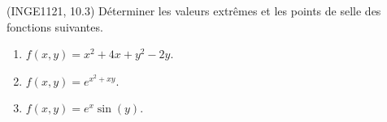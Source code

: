 
\begin{exercice}\label{exoFoncDeuxVar0028}

	(INGE1121, 10.3) Déterminer les valeurs extrêmes et les points de selle des fonctions suivantes.
	\begin{multicols}{2}
		\begin{enumerate}
			\item	%
				$f(x,y)=x^2+4x+y^2-2y$.
			\item	%
				$f(x,y)= e^{x^2+xy}$.
			\item	%
				$f(x,y)=e^x\sin(y)$.
		\end{enumerate}
	\end{multicols}

\end{exercice}
